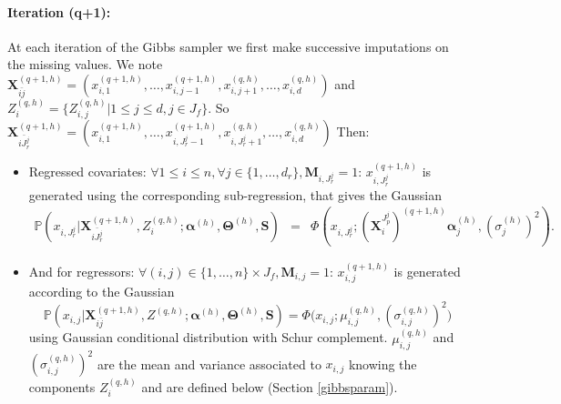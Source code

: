 \documentclass[12pt,a4paper]{report}
\begin{document}
		\paragraph{Iteration (q+1):} At each iteration of the Gibbs sampler we first make successive imputations on the missing values. We note $\boldsymbol{X}^{(q+1,h)}_{\bar{ij}}=(x_{i,1}^{(q+1,h)},\dots, x^{(q+1,h)}_{i,j-1},x_{i,j+1}^{(q,h)},\dots, x_{i,d}^{(q,h)})$ and $Z_{i}^{(q,h)}=\{Z_{i,j}^{(q,h)}|1\leq j \leq d, j\in J_f \}$. So $\boldsymbol{X}^{(q+1,h)}_{\bar{iJ_r^j}}=(x_{i,1}^{(q+1,h)},\dots, x^{(q+1,h)}_{i,J_r^j-1},x_{i,J_r^j+1}^{(q,h)},\dots, x_{i,d}^{(q,h)})$  Then: 
		\begin{itemize}
			\item Regressed covariates: $\forall 1\leq i \leq n, \forall j \in \{1,\dots,d_r \}, \boldsymbol{M}_{i,J_r^j}=1  $:  $x_{i,J_r^j}^{(q+1,h)}$ is generated using the corresponding sub-regression, that gives the Gaussian
			\begin{eqnarray}
			\mathbb{P}(x_{i,J_r^j}|\boldsymbol{X}^{(q+1,h)}_{\bar{iJ_r^j}},Z_i^{(q,h)};\boldsymbol{\alpha}^{(h)},\boldsymbol{\Theta}^{(h)},\boldsymbol{S})%
			&=&\Phi(x_{i,J_r^j};(\boldsymbol{X}_i^{J_p^j})^{(q+1,h)}\boldsymbol{\alpha}^{(h)}_{j},(\sigma_j^{(h)})^2 ). \nonumber
			\end{eqnarray}		
			\item And for regressors:
			$\forall (i,j) \in \{1,\dots,n \}\times J_f,\boldsymbol{M}_{i,j}=1$:  $x_{i,j}^{(q+1,h)}$ is generated according to the Gaussian 
			$$\mathbb{P}(x_{i,j}|\boldsymbol{X}_{i\bar{j}}^{(q+1,h)},Z^{(q,h)};\boldsymbol{\alpha}^{(h)},\boldsymbol{\Theta}^{(h)},\boldsymbol{S})=\Phi \big(x_{i,j}; \mu_{i,j}^{(q,h)}, (\sigma_{i,j}^{(q,h)})^2\big)$$ 
			using Gaussian conditional distribution with Schur complement. $\mu_{i,j}^{(q,h)}$ and $(\sigma_{i,j}^{(q,h)})^2$  are the mean and variance associated to $x_{i,j}$ knowing the components $Z_i^{(q,h)}$ and are defined below (Section \ref{gibbsparam}).
			\end{itemize}
				
\end{document}
